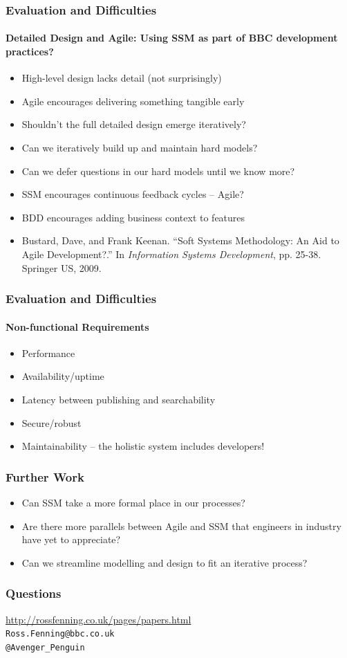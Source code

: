 \documentclass{beamer}
\begin{document}
\begin{frame}
  \frametitle{Evaluation and Difficulties}
  \framesubtitle{Detailed Design and Agile: Using SSM as part of BBC development practices?}
  \begin{itemize}
    \item High-level design lacks detail (not surprisingly)
    \item Agile encourages delivering something tangible early
    \item Shouldn't the full detailed design emerge iteratively?
    \item Can we iteratively build up and maintain hard models?
    \item Can we defer questions in our hard models until we know more?
    \item SSM encourages continuous feedback cycles -- Agile?
    \item BDD encourages adding business context to features
    \item Bustard, Dave, and Frank Keenan. ``Soft Systems Methodology: An Aid to Agile Development?.''
      In \emph{Information Systems Development}, pp. 25-38. Springer US, 2009.
  \end{itemize}
\end{frame}

\begin{frame}
  \frametitle{Evaluation and Difficulties}
  \framesubtitle{Non-functional Requirements}
  \begin{itemize}
    \item Performance
    \item Availability/uptime
    \item Latency between publishing and searchability
    \item Secure/robust
    \item Maintainability -- the holistic system includes developers!
  \end{itemize}
\end{frame}

\begin{frame}
  \frametitle{Further Work}
  \begin{itemize}
    \item Can SSM take a more formal place in our processes?
    \item Are there more parallels between Agile and SSM that engineers in industry have yet to appreciate?
    \item Can we streamline modelling and design to fit an iterative process?
  \end{itemize}
\end{frame}

\begin{frame}
  \frametitle{Questions}
  \begin{center}
    \url{http://rossfenning.co.uk/pages/papers.html}\\
    \texttt{Ross.Fenning@bbc.co.uk}\\
    \texttt{@Avenger\_Penguin}
  \end{center}
\end{frame}
\end{document}
